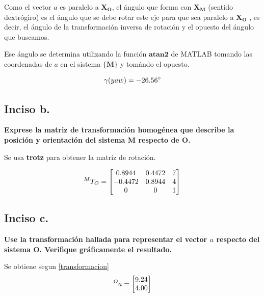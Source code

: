 \documentclass[a4paper,12pt]{article}
\begin{document}
Como el vector $a$ es paralelo a $\mathbf{X_O}$, 
el ángulo que forma con $\mathbf{X_M}$ (sentido dextrógiro)
es el ángulo que se debe rotar este eje para que sea paralelo a $\mathbf{X_O}$
, es decir, el ángulo de la transformación inversa de rotación y el opuesto del 
ángulo que buscamos.

Ese ángulo se determina utilizando la función $\mathbf{atan2}$ de MATLAB tomando las coordenadas
de $a$ en el sistema $\mathbf{\{M\}}$ y tomándo el opuesto.

\[
    \gamma \text(yaw) = -26.56^\circ
\]

\subsection{Inciso b.}
\textbf{Exprese la matriz de transformación homogénea que describe la posición y orientación
del sistema {M} respecto de {O}.}
\vspace{0.5 cm}

Se usa \textbf{trotz} para obtener la matriz de rotación.

\begin{equation*}
    \prescript{M}{}{T_O} = 
    \begin{bmatrix}
        0.8944  & 0.4472       & 7 \\
        -0.4472 & 0.8944       & 4 \\
        0       & 0            & 1
    \end{bmatrix}
\end{equation*}

\subsection{Inciso c.}
\textbf{Use la transformación hallada para representar el vector $a$ respecto del sistema {O}.
Verifique gráficamente el resultado.}
\vspace{0.5 cm}

Se obtiene segun \cref{transformacion}
\[
    \prescript{O}{}{a} =
    \begin{bmatrix}
        9.24\\
        4.00
    \end{bmatrix}
\]
\end{document}
